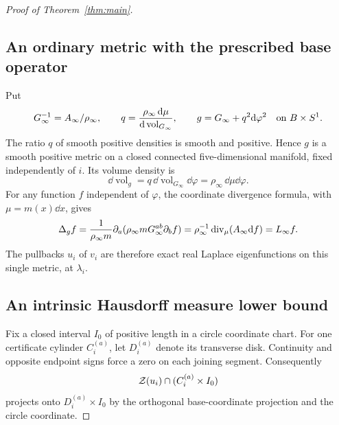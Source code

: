 \begin{proof}[Proof of Theorem~\ref{thm:main}]
\subsection*{An ordinary metric with the prescribed base operator}

Put
\[
 G_\infty^{-1}=A_\infty/\rho_\infty,\qquad
 q=\frac{\rho_\infty\,\mathrm d\mu}{\mathrm d\operatorname{vol}_{G_\infty}},
 \qquad
 g=G_\infty+q^2\mathrm d\varphi^2\quad\hbox{on }B\times S^1 .
\]
The ratio \(q\) of smooth positive densities is smooth and positive.
Hence \(g\) is a smooth positive metric on a closed connected
five-dimensional manifold, fixed independently of \(i\).
Its volume density is
\[
 \dd\operatorname{vol}_g
      =q\,\dd\operatorname{vol}_{G_\infty}\dd\varphi
      =\rho_\infty\,\dd\mu\dd\varphi .
\]
For any function \(f\) independent of \(\varphi\), the coordinate
divergence formula, with \(\mu=m(x)\dd x\), gives
\begin{equation}\label{eq:circle}
 \Delta_g f=\frac{1}{\rho_\infty m}
  \partial_a(\rho_\infty mG_\infty^{ab}\partial_b f)
     =\rho_\infty^{-1}\operatorname{div}_\mu(A_\infty\mathrm d f)=L_\infty f .
\end{equation}
The pullbacks \(u_i\) of \(v_i\) are therefore exact real
Laplace eigenfunctions on this single metric, at \(\lambda_i\).

\subsection*{An intrinsic Hausdorff measure lower bound}

Fix a closed interval \(I_0\) of positive length in a circle
coordinate chart. For one certificate cylinder \(C_i^{(a)}\),
let \(D_i^{(a)}\) denote its transverse disk.
Continuity and opposite endpoint signs force a zero on each
joining segment. Consequently
\[
 \mathcal Z(u_i)\cap(C_i^{(a)}\times I_0)
\]
projects onto \(D_i^{(a)}\times I_0\) by the orthogonal
base-coordinate projection and the circle coordinate.


\end{proof}
